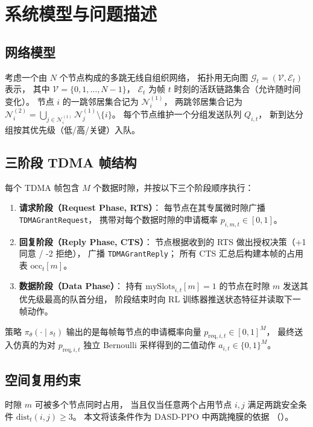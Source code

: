 \section{系统模型与问题描述}
\label{sec:model}

\subsection{网络模型}

考虑一个由 \(N\) 个节点构成的多跳无线自组织网络，
拓扑用无向图 \(\mathcal{G}_t = (\mathcal{V},\mathcal{E}_t)\) 表示，
其中 \(\mathcal{V}=\{0,1,\ldots,N-1\}\)，
\(\mathcal{E}_t\) 为帧 \(t\) 时刻的活跃链路集合（允许随时间变化）。
节点 \(i\) 的一跳邻居集合记为 \(\mathcal{N}_i^{(1)}\)，
两跳邻居集合记为 \(\mathcal{N}_i^{(2)}=\bigcup_{j\in\mathcal{N}_i^{(1)}}\mathcal{N}_j^{(1)}\setminus\{i\}\)。
每个节点维护一个分组发送队列 \(Q_{i,t}\)，
新到达分组按其优先级（低/高/关键）入队。

\subsection{三阶段 TDMA 帧结构}

每个 TDMA 帧包含 \(M\) 个数据时隙，并按以下三个阶段顺序执行：
\begin{enumerate}
    \item \textbf{请求阶段（Request Phase, RTS）}：
        每节点在其专属微时隙广播 \texttt{TDMAGrantRequest}，
        携带对每个数据时隙的申请概率 \(p_{i,m,t}\in[0,1]\)。
    \item \textbf{回复阶段（Reply Phase, CTS）}：
        节点根据收到的 RTS 做出授权决策（+1 同意 / -2 拒绝），
        广播 \texttt{TDMAGrantReply}；
        所有 CTS 汇总后构建本帧的占用表 \(\mathrm{occ}_t[m]\)。
    \item \textbf{数据阶段（Data Phase）}：
        持有 \(\mathrm{mySlots}_{i,t}[m]=1\) 的节点在时隙 \(m\) 发送其优先级最高的队首分组，
        阶段结束时向 RL 训练器推送状态特征并读取下一帧动作。
\end{enumerate}
策略 \(\pi_\theta(\cdot\mid s_t)\) 输出的是每帧每节点的申请概率向量
\(p_{\mathrm{req},i,t}\in[0,1]^M\)，
最终送入仿真的为对 \(p_{\mathrm{req},i,t}\) 独立 Bernoulli 采样得到的二值动作
\(a_{i,t}\in\{0,1\}^M\)。

\subsection{空间复用约束}

时隙 \(m\) 可被多个节点同时占用，
当且仅当任意两个占用节点 \(i,j\) 满足两跳安全条件 \(\mathrm{dist}_t(i,j)\ge 3\)。
本文将该条件作为 DASD-PPO 中两跳掩膜的依据
（）。

